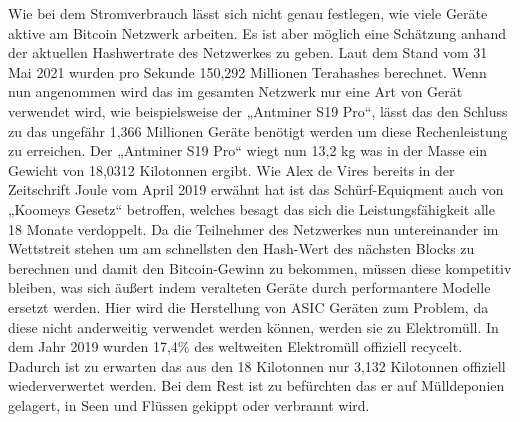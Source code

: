 Wie bei dem Stromverbrauch lässt sich nicht genau festlegen, wie viele Geräte aktive am Bitcoin Netzwerk arbeiten. Es ist aber möglich eine Schätzung anhand der aktuellen Hashwertrate \cite{blockchaincom_statistic_nodate} des Netzwerkes zu geben. Laut dem Stand vom 31 Mai 2021 wurden pro Sekunde 150,292 Millionen Terahashes berechnet. Wenn nun angenommen wird das im gesamten Netzwerk nur eine Art von Gerät verwendet wird, wie beispielsweise der „Antminer S19 Pro“, lässt das den Schluss zu das ungefähr 1,366 Millionen Geräte benötigt werden um diese Rechenleistung zu erreichen. Der „Antminer S19 Pro“ wiegt nun 13,2 kg was in der Masse ein Gewicht von 18,0312 Kilotonnen ergibt. Wie Alex de Vires \cite{de_vries_renewable_2019} bereits in der Zeitschrift Joule vom April 2019 erwähnt hat ist das Schürf-Equiqment auch von „Koomeys Gesetz“ betroffen, welches besagt das sich die Leistungsfähigkeit alle 18 Monate verdoppelt. Da die Teilnehmer des Netzwerkes nun untereinander im Wettstreit stehen um am schnellsten den Hash-Wert des nächsten Blocks zu berechnen und damit den Bitcoin-Gewinn zu bekommen, müssen diese kompetitiv bleiben, was sich äußert indem veralteten Geräte durch performantere Modelle ersetzt werden. Hier wird die Herstellung von ASIC Geräten zum Problem, da diese nicht anderweitig verwendet werden können, werden sie zu Elektromüll. In dem Jahr 2019 wurden 17,4\% \cite{forti_global_nodate} des weltweiten Elektromüll offiziell recycelt. Dadurch ist zu erwarten das aus den 18 Kilotonnen nur 3,132 Kilotonnen offiziell wiederverwertet werden. Bei dem Rest ist zu befürchten das er auf Mülldeponien gelagert, in Seen und Flüssen gekippt oder verbrannt wird.

